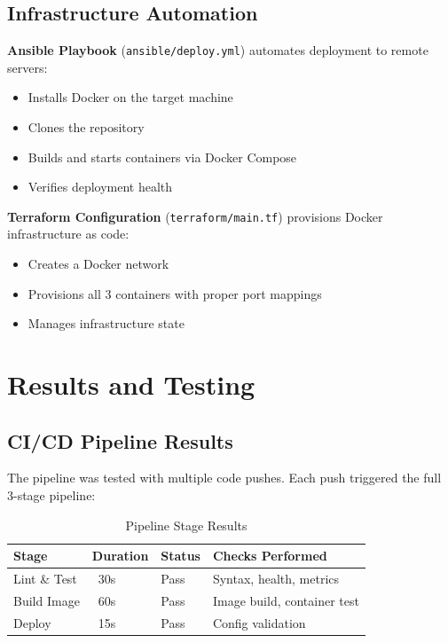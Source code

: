 \documentclass[12pt,a4paper]{article}
\begin{document}
\begin{center}
\end{center}

\subsection{Infrastructure Automation}

\textbf{Ansible Playbook} (\texttt{ansible/deploy.yml}) automates deployment to remote servers:
\begin{itemize}[nosep]
    \item Installs Docker on the target machine
    \item Clones the repository
    \item Builds and starts containers via Docker Compose
    \item Verifies deployment health
\end{itemize}

\textbf{Terraform Configuration} (\texttt{terraform/main.tf}) provisions Docker infrastructure as code:
\begin{itemize}[nosep]
    \item Creates a Docker network
    \item Provisions all 3 containers with proper port mappings
    \item Manages infrastructure state
\end{itemize}

\section{Results and Testing}

\subsection{CI/CD Pipeline Results}
The pipeline was tested with multiple code pushes. Each push triggered the full 3-stage pipeline:

\begin{table}[h!]
\centering
\begin{tabular}{@{}llll@{}}
\toprule
\textbf{Stage} & \textbf{Duration} & \textbf{Status} & \textbf{Checks Performed} \\
\midrule
Lint \& Test & ~30s & Pass & Syntax, health, metrics \\
Build Image & ~60s & Pass & Image build, container test \\
Deploy & ~15s & Pass & Config validation \\
\bottomrule
\end{tabular}
\caption{Pipeline Stage Results}
\end{table}
\end{document}
